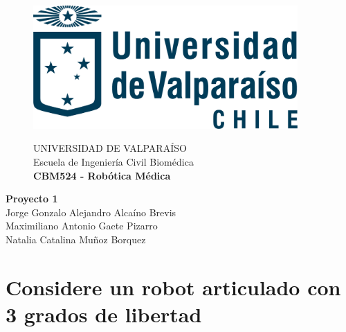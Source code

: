 \documentclass[10pt]{article}
\theoremstyle{definition}
\theoremstyle{remark}
\theoremstyle{definition}
\numberwithin{equation}{prob}
\begin{document}
\begin{sloppypar}

\end{sloppypar}

\begin{titlepage}
	\begin{figure}
		\begin{minipage}{4cm}
			\includegraphics[width=0.9\textwidth]{./figures/logo}
		\end{minipage}
		\begin{minipage}{11cm}
			\vspace{4mm}
			{\sc UNIVERSIDAD DE VALPARAÍSO}\\
			Escuela de Ingeniería Civil Biomédica\\
			{\bf CBM524 - Robótica Médica}\\
			\vspace{0mm}
			\hrulefill
		\end{minipage}
	\end{figure}
	\phantom{""}\vspace{60mm}


	\begin{center}
		\Huge{\textbf{Proyecto 1}}\vspace{95mm}\\
		\raggedleft \Large{Jorge Gonzalo Alejandro Alcaíno Brevis}\\
		\raggedleft \Large{Maximiliano Antonio Gaete Pizarro}\\
		\raggedleft \Large{Natalia Catalina Muñoz Borquez}\\
	\end{center}


\end{titlepage}

\section{Considere un robot articulado con 3 grados de libertad}
\end{document}
